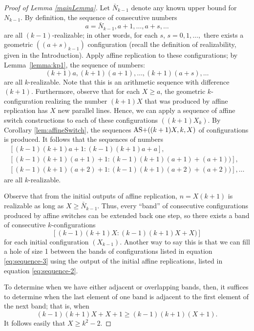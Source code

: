 \documentclass[reqno,12pt]{amsart}
\theoremstyle{plain}
\theoremstyle{definition}
\theoremstyle{remark}
\begin{document}
\begin{proof}[Proof of Lemma \ref{mainLemma}]

Let $\bar{N}_{k-1}$ denote any known upper bound for $N_{k-1}$. By definition, the  sequence 
of consecutive numbers
%
\begin{equation} \label{eq:sequence-1}
a=\bar{N}_{k-1}, a+1, \ldots, a+s, \ldots
\end{equation}
are all $(k-1)$-realizable; in other words, for each $s$, $s=0,1,\dots,$ there exists a geometric $((a+s)_{k-1})$ 
configuration (recall the definition of realizability, given in the Introduction). Apply affine replication to these configurations; 
by Lemma~\ref{lemma:kp1}, the  sequence of numbers:
%
\begin{equation} \label{eq:sequence-2}
(k+1)a, (k+1)(a+1),\ldots, (k+1)(a+s), \dots
\end{equation}
%
are all $k$-realizable. Note that this is an arithmetic sequence with difference $(k+1)$.
Furthermore, observe that for each $X \geq a$, the geometric $k$-configuration realizing the number $(k+1)X$ 
that was produced by affine replication has $X$ new parallel lines. 
Hence, we can apply a sequence of affine switch constructions to each of these configurations $((k+1)X_{k})$.
By Corollary \ref{lem:affineSwitch}, the sequences $\mathrm{AS+}((k+1)X, k, X)$ of configurations is produced.
It follows that the sequences of numbers
%
\begin{multline}\label{eq:sequence-3}
[(k-1) (k+1) a+1:(k-1) (k+1)a+a], \\
[(k-1) (k+1)(a+1)+1:(k-1) (k+1) (a+1)+(a+1))], \\
[(k-1) (k+1)(a+2)+1:(k-1) (k+1) (a+2)+(a+2))],\ldots
\end{multline}
are all $k$-realizable.

Observe that from the initial outputs of affine replication, $n = X(k+1)$ is realizable as long as $X \geq \bar{N}_{k-1}$. 
Thus, every ``band'' of consecutive configurations produced by affine switches can be extended back one step, so there 
exists a band of consecutive $k$-configurations 
\[[(k-1)(k+1)X:(k-1) (k+1)X + X)] \]
for each initial configuration $(X_{k-1})$. 
Another way to say this is that we can fill a hole of size 1 between the bands of configurations listed in equation \eqref{eq:sequence-3} 
using the output of the initial affine replications, listed in equation \eqref{eq:sequence-2}.

To determine when we have either adjacent or overlapping bands, then, it suffices to determine when the last element of one band is 
adjacent to the first element of the next band; that is, when 
\[(k-1) (k+1) X+X + 1\geq (k-1) (k+1) (X+1).\]
It follows easily that $X \geq k^{2}-2$.


\end{proof}
\end{document}
